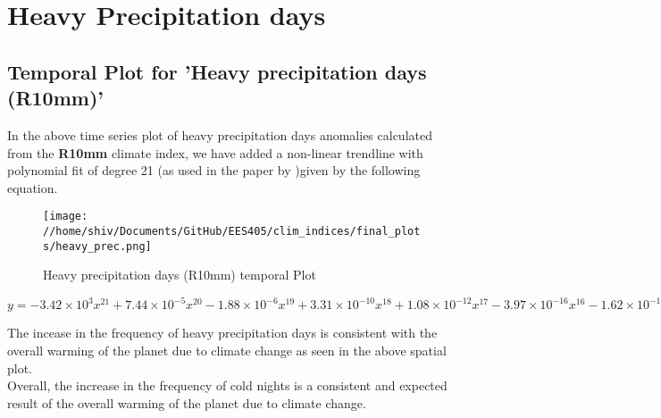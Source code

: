 \documentclass[a4paper, 12pt, twoside]{report}
\begin{document}
\section {Heavy Precipitation days}

\subsection{Temporal Plot for 'Heavy precipitation days (R10mm)'}
In the above time series plot of heavy precipitation days anomalies calculated from the \textbf{R10mm} climate index, we have added a non-linear trendline with polynomial fit of degree 21 (as used in the paper by )given by the following equation. \\
\begin{figure}[htb]
    \centering
    \texttt{[image: //home/shiv/Documents/GitHub/EES405/clim\_indices/final\_plots/heavy\_prec.png]}
    \caption{Heavy precipitation days (R10mm) temporal Plot}
    \label{fig:r10mm_temporal}
\end{figure}

$ y = -3.42\times10^{3}x^{21}+7.44\times10^{-5}x^{20}-1.88\times10^{-6}x^{19}+3.31\times10^{-10}x^{18}+1.08\times10^{-12}x^{17}-3.97\times10^{-16}x^{16}-1.62\times10^{-19}x^{15}+1.05\times10^{-22}x^{14}-5.80\times10^{-27}x^{13}-8.00\times10^{-30}x^{12}+2.29\times10^{-33}x^{11}-1.20\times10^{-37}x^{10}-6.72\times10^{-41}x^{9}+1.99\times10^{-44}x^{8}-2.95\times10^{-48}x^{7}+2.85\times10^{-52}x^{6}-1.92\times10^{-56}x^{5}+9.12\times10^{-61}x^{4}-3.03\times10^{-65}x^{3}+6.69\times10^{-70}x^{2}-8.87\times10^{-75}x+5.34\times10^{-80}$

The incease in the frequency of heavy precipitation days is consistent with the overall warming of the planet due to climate change as seen in the above spatial plot.\\
Overall, the increase in the frequency of cold nights is a consistent and expected result of the overall warming of the planet due to climate change.
\end{document}

